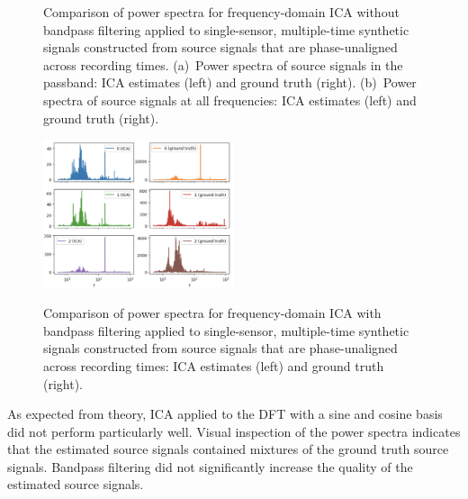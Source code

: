\documentclass[10pt]{article}
\begin{document}
\begin{figure}[ht]
    \vspace{0.1in}
    \begin{minipage}{0.85\linewidth}
    \caption{\label{fig:single-sensor-ica-freq-domain-phase-unaligned-without-filter-source-power-spectra}
        Comparison of power spectra for frequency-domain ICA without bandpass filtering
        applied to single-sensor, multiple-time synthetic signals constructed from source
        signals that are phase-unaligned across recording times.
        (a)~Power spectra of source signals in the passband: ICA estimates (left) and
        ground truth (right).
        (b)~Power spectra of source signals at all frequencies: ICA estimates (left)
        and ground truth (right).
    }
    \end{minipage}
\end{figure}

\begin{figure}[ht]
    \centering
    \includegraphics[width=0.5\textwidth]{single-sensor-ica-freq-domain-phase-unaligned-with-filter-source-power-spectra}
    \begin{minipage}{0.85\linewidth}
    \caption{\label{fig:single-sensor-ica-freq-domain-phase-unaligned-with-filter-source-power-spectra}}
        Comparison of power spectra for frequency-domain ICA with bandpass filtering
        applied to single-sensor, multiple-time synthetic signals constructed from source
        signals that are phase-unaligned across recording times: ICA estimates (left) and
        ground truth (right).
    \end{minipage}
\end{figure}

As expected from theory, ICA applied to the DFT with a sine and cosine basis did not
perform particularly well. Visual inspection of the power spectra indicates that the
estimated source signals contained mixtures of the ground truth source signals. Bandpass
filtering did not significantly increase the quality of the estimated source signals.
\end{document}
